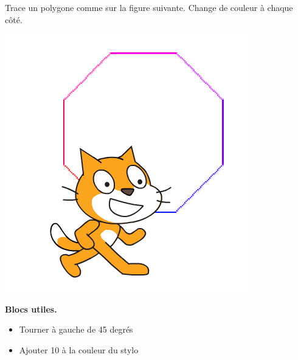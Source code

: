 \documentclass[class=report,crop=false, 12pt]{standalone}
\begin{document}
\begin{activite}
Trace un polygone comme sur la figure suivante. Change de couleur à chaque côté. 
\begin{center}
  \includegraphics[scale=\scaleecran]{ecran-02-ex2}   
\end{center}


\textbf{Blocs utiles.}
\begin{itemize}
  \item Tourner à gauche de 45 degrés
  \item Ajouter 10 à la couleur du stylo
\end{itemize}
\end{activite}
\end{document}
